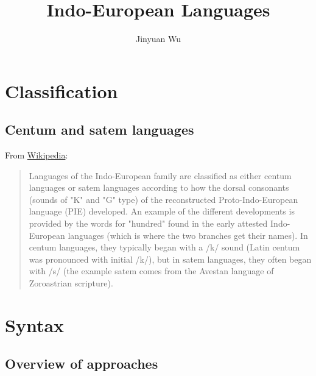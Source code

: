 \documentclass[a4paper]{article}
\title{Indo-European Languages}
\author{Jinyuan Wu}
\newcommand{\cswiki}{\href{https://en.wikipedia.org/wiki/Centum_and_satem_languages}{Wikipedia}}
\begin{document}
\maketitle

\section{Classification}

\subsection{Centum and satem languages}

From \cswiki:
\begin{quote}
    Languages of the Indo-European family are classified as either centum languages or satem languages according to how the dorsal consonants (sounds of "K" and "G" type) of the reconstructed Proto-Indo-European language (PIE) developed. An example of the different developments is provided by the words for "hundred" found in the early attested Indo-European languages (which is where the two branches get their names). In centum languages, they typically began with a /k/ sound (Latin centum was pronounced with initial /k/), but in satem languages, they often began with /s/ (the example satem comes from the Avestan language of Zoroastrian scripture).
\end{quote}

\section{Syntax}

\subsection{Overview of approaches}

\cite{lehmann1974proto}



\end{document}
